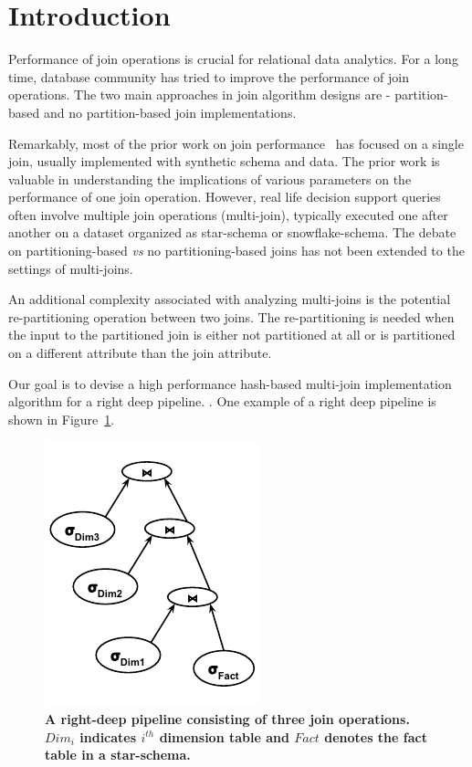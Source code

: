 \section{Introduction}
Performance of join operations is crucial for relational data analytics. 
For a long time, database community has tried to improve the performance of join operations. 
The two main approaches in join algorithm designs are - partition-based and no partition-based join implementations. 

Remarkably, most of the prior work on join performance~\cite{DBLP:conf/sigmod/BlanasLP11,DBLP:conf/sigmod/SchuhCD16} has focused on a single join, usually implemented with synthetic schema and data. 
The prior work is valuable in understanding the implications of various parameters on the performance of one join operation. 
However, real life decision support queries often involve multiple join operations (multi-join), typically executed one after another on a dataset organized as star-schema or snowflake-schema. 
The debate on partitioning-based \textit{vs} no partitioning-based joins has not been extended to the settings of multi-joins. 

An additional complexity associated with analyzing multi-joins is the potential re-partitioning operation between two joins. 
The re-partitioning is needed when the input to the partitioned join is either not partitioned at all or is partitioned on a different attribute than the join attribute.

Our goal is to devise a high performance hash-based multi-join implementation algorithm for a right deep pipeline.
.
One example of a right deep pipeline is shown in Figure~\ref{fig:right-deep-pipeline}.

\begin{figure}[t]
	\centering
	\includegraphics[]{figures/right-deep-pipeline.pdf}
		\vspace*{-1.5em}
	\caption{\textbf{A right-deep pipeline consisting of three join operations. $Dim_i$ indicates $i^{th}$ dimension table and $Fact$ denotes the fact table in a star-schema.}}
	\label{fig:right-deep-pipeline}
		\vspace*{-1.5em}
\end{figure}

